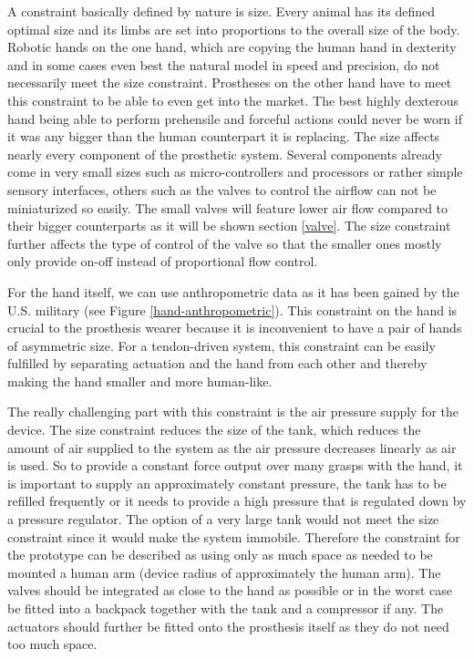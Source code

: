 \documentclass[main]{subfiles}
\begin{document}
A constraint basically defined by nature is size. Every animal has its defined optimal size and its limbs are set into proportions to the overall size of the body. Robotic hands on the one hand, which are copying the human hand in dexterity and in some cases even best the natural model in speed and precision, do not necessarily meet the size constraint. Prostheses on the other hand have to meet this constraint to be able to even get into the market. The best highly dexterous hand being able to perform prehensile and forceful actions could never be worn if it was any bigger than the human counterpart it is replacing. The size affects nearly every component of the prosthetic system. Several components already come in very small sizes such as micro-controllers and processors or rather simple sensory interfaces, others such as the valves to control the airflow can not be miniaturized so easily. The small valves will feature lower air flow compared to their bigger counterparts as it will be shown section \ref{valve}. The size constraint further affects the type of control of the valve so that the smaller ones mostly only provide on-off instead of proportional flow control. 

For the hand itself, we can use anthropometric data as it has been gained by the U.S. military (see Figure \ref{hand-anthropometric}). This constraint on the hand is crucial to the prosthesis wearer because it is inconvenient to have a pair of hands of asymmetric size. For a tendon-driven system, this constraint can be easily fulfilled by separating actuation and the hand from each other and thereby making the hand smaller and more human-like.

The really challenging part with this constraint is the air pressure supply for the device. The size constraint reduces the size of the tank, which reduces the amount of air supplied to the system as the air pressure decreases linearly as air is used. So to provide a constant force output over many grasps with the hand, it is important to supply an approximately constant pressure, the tank has to be refilled frequently or it needs to provide a high pressure that is regulated down by a pressure regulator. The option of a very large tank would not meet the size constraint since it would make the system immobile. Therefore the constraint for the prototype can be described as using only as much space as needed to be mounted a human arm (device radius of approximately the human arm). The valves should be integrated as close to the hand as possible or in the worst case be fitted into a backpack together with the tank and a compressor if any. The actuators should further be fitted onto the prosthesis itself as they do not need too much space.
\end{document}
